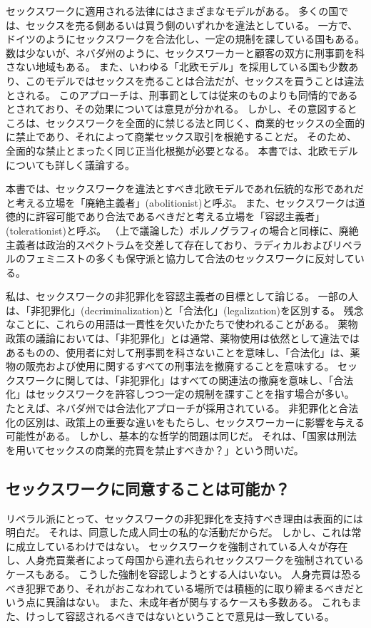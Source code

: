 \documentclass[paper=a4,book,openany]{jlreq} \usepackage{mystyle}
\begin{document}
セックスワークに適用される法律にはさまざまなモデルがある。
多くの国では、セックスを売る側あるいは買う側のいずれかを違法としている。
一方で、ドイツのようにセックスワークを合法化し、一定の規制を課している国もある。
数は少ないが、ネバダ州のように、セックスワーカーと顧客の双方に刑事罰を科さない地域もある。
また、いわゆる「北欧モデル」を採用している国も少数あり、このモデルではセックスを売ることは合法だが、セックスを買うことは違法とされる。
このアプローチは、刑事罰としては従来のものよりも同情的であるとされており、その効果については意見が分かれる。
しかし、その意図するところは、セックスワークを全面的に禁じる法と同じく、商業的セックスの全面的に禁止であり、それによって商業セックス取引を根絶することだ。
そのため、全面的な禁止とまったく同じ正当化根拠が必要となる。
本書では、北欧モデルについても詳しく議論する。

本書では、セックスワークを違法とすべき{\DDASH}北欧モデルであれ伝統的な形であれ{\DDASH}だと考える立場を「廃絶主義者」(abolitionist)と呼ぶ。
また、セックスワークは道徳的に許容可能であり合法であるべきだと考える立場を「容認主義者」(tolerationist)と呼ぶ。
（上で議論した）ポルノグラフィの場合と同様に、廃絶主義者は政治的スペクトラムを交差して存在しており、ラディカルおよびリベラルのフェミニストの多くも保守派と協力して合法のセックスワークに反対している。

私は、セックスワークの非犯罪化を容認主義者の目標として論じる。
一部の人は、「非犯罪化」(decriminalization)と「合法化」(legalization)を区別する。
残念なことに、これらの用語は一貫性を欠いたかたちで使われることがある。
薬物政策の議論においては、「非犯罪化」とは通常、薬物使用は依然として違法ではあるものの、使用者に対して刑事罰を科さないことを意味し、「合法化」は、薬物の販売および使用に関するすべての刑事法を撤廃することを意味する。
セックスワークに関しては、「非犯罪化」はすべての関連法の撤廃を意味し、「合法化」はセックスワークを許容しつつ一定の規制を課すことを指す場合が多い。
たとえば、ネバダ州では合法化アプローチが採用されている。
非犯罪化と合法化の区別は、政策上の重要な違いをもたらし、セックスワーカーに影響を与える可能性がある。
しかし、基本的な哲学的問題は同じだ。
それは、「国家は刑法を用いてセックスの商業的売買を禁止すべきか？」という問いだ\citep{tani15:_sex_worker_explain_differ_legal_decrim_prost}。

\subsection{セックスワークに同意することは可能か？}

リベラル派にとって、セックスワークの非犯罪化を支持すべき理由は表面的には明白だ。
それは、同意した成人同士の私的な活動だからだ。
しかし、これは常に成立しているわけではない。
セックスワークを強制されている人々が存在し、人身売買業者によって母国から連れ去られセックスワークを強制されているケースもある。
こうした強制を容認しようとする人はいない。
人身売買は恐るべき犯罪であり、それがおこなわれている場所では積極的に取り締まるべきだという点に異論はない。
また、未成年者が関与するケースも多数ある。
これもまた、けっして容認されるべきではないということで意見は一致している。
\end{document}
